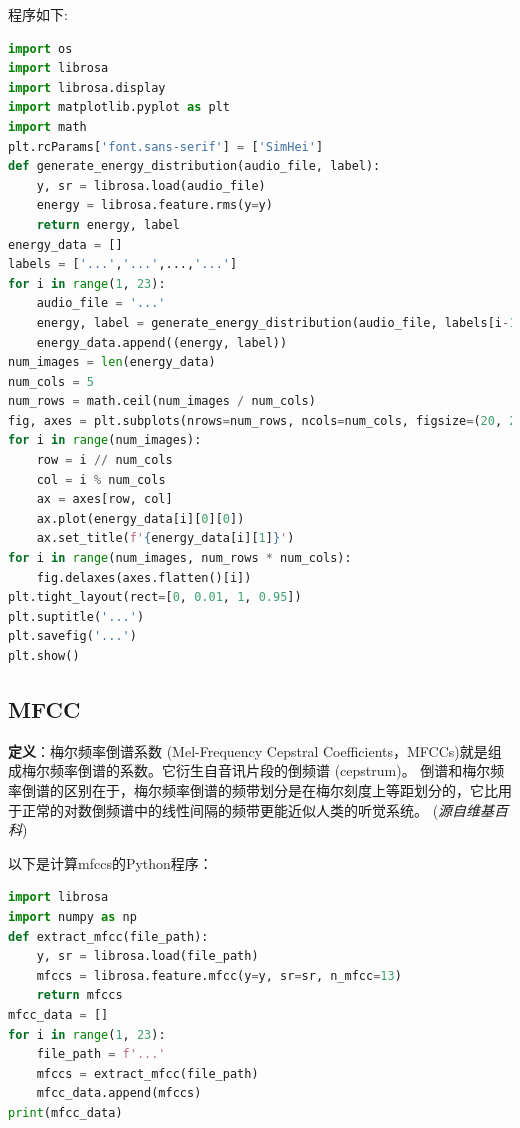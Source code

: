 \documentclass[lang=cn]{elegantpaper}
\begin{document}
程序如下:
\begin{lstlisting}[language=Python]
import os
import librosa
import librosa.display
import matplotlib.pyplot as plt
import math
plt.rcParams['font.sans-serif'] = ['SimHei']
def generate_energy_distribution(audio_file, label):
    y, sr = librosa.load(audio_file)
    energy = librosa.feature.rms(y=y)
    return energy, label
energy_data = []
labels = ['...','...',...,'...']
for i in range(1, 23):
    audio_file = '...'
    energy, label = generate_energy_distribution(audio_file, labels[i-1])
    energy_data.append((energy, label))
num_images = len(energy_data)
num_cols = 5
num_rows = math.ceil(num_images / num_cols)
fig, axes = plt.subplots(nrows=num_rows, ncols=num_cols, figsize=(20, 20))
for i in range(num_images):
    row = i // num_cols
    col = i % num_cols
    ax = axes[row, col]
    ax.plot(energy_data[i][0][0])
    ax.set_title(f'{energy_data[i][1]}')
for i in range(num_images, num_rows * num_cols):
    fig.delaxes(axes.flatten()[i])
plt.tight_layout(rect=[0, 0.01, 1, 0.95])
plt.suptitle('...')
plt.savefig('...')
plt.show()
\end{lstlisting}
\subsection{MFCC}
\textbf{定义}：梅尔频率倒谱系数 (Mel-Frequency Cepstral Coefficients，MFCCs)就是组成梅尔频率倒谱的系数。它衍生自音讯片段的倒频谱 (cepstrum)。
倒谱和梅尔频率倒谱的区别在于，梅尔频率倒谱的频带划分是在梅尔刻度上等距划分的，它比用于正常的对数倒频谱中的线性间隔的频带更能近似人类的听觉系统。 (\textit{源自维基百科}) 

以下是计算mfccs的Python程序：
\begin{lstlisting}[language=Python]
import librosa
import numpy as np
def extract_mfcc(file_path):
    y, sr = librosa.load(file_path)
    mfccs = librosa.feature.mfcc(y=y, sr=sr, n_mfcc=13)
    return mfccs
mfcc_data = []
for i in range(1, 23):
    file_path = f'...'
    mfccs = extract_mfcc(file_path)
    mfcc_data.append(mfccs)
print(mfcc_data)
\end{lstlisting}
\end{document}
